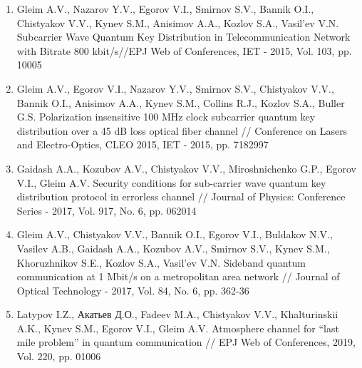 \begin{enumerate}
\item    Gleim A.V., Nazarov Y.V., Egorov V.I., Smirnov S.V., Bannik O.I., Chistyakov V.V., Kynev S.M., Anisimov A.A., Kozlov S.A., Vasil'ev V.N. Subcarrier Wave Quantum Key Distribution in Telecommunication Network with Bitrate 800 kbit/s//EPJ Web of Conferences, IET - 2015, Vol. 103, pp. 10005
\\
\item    Gleim A.V., Egorov V.I., Nazarov Y.V., Smirnov S.V., Chistyakov V.V., Bannik O.I., Anisimov A.A., Kynev S.M., Collins R.J., Kozlov S.A., Buller G.S. Polarization insensitive 100 MHz clock subcarrier quantum key distribution over a 45 dB loss optical fiber channel // Conference on Lasers and Electro-Optics, CLEO 2015, IET - 2015, pp. 7182997
\\
\item Gaidash A.A., Kozubov A.V., Chistyakov V.V., Miroshnichenko G.P., Egorov V.I., Gleim A.V. Security conditions for sub-carrier wave quantum key distribution protocol in errorless channel // Journal of Physics: Conference Series - 2017, Vol. 917, No. 6, pp. 062014
\\
\item  Gleim A.V., Chistyakov V.V., Bannik O.I., Egorov V.I., Buldakov N.V., Vasilev A.B., Gaidash A.A., Kozubov A.V., Smirnov S.V., Kynev S.M., Khoruzhnikov S.E., Kozlov S.A., Vasil'ev V.N. Sideband quantum communication at 1 Mbit/s on a metropolitan area network // Journal of Optical Technology - 2017, Vol. 84, No. 6, pp. 362-36
\\
\item Latypov I.Z., Акатьев Д.О., Fadeev M.A., Chistyakov V.V., Khalturinskii A.K., Kynev S.M., Egorov V.I., Gleim A.V. Atmosphere channel for “last mile problem” in quantum communication // EPJ Web of Conferences, 2019, Vol. 220, pp. 01006

\end{enumerate}

